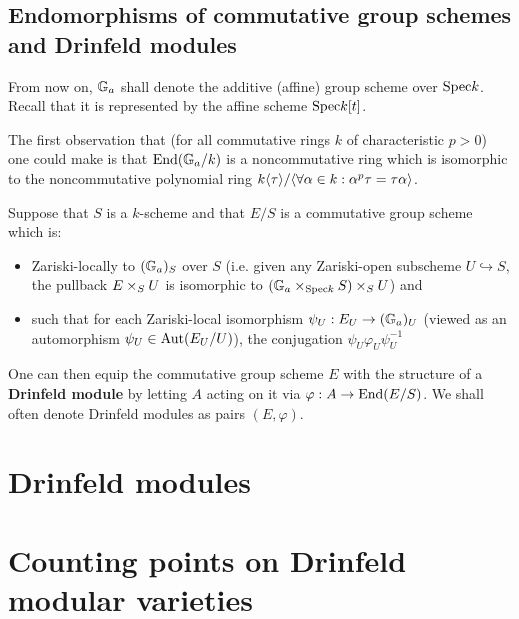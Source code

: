         \subsection{Endomorphisms of commutative group schemes and Drinfeld modules}
            \begin{convention}
                From now on, $\mathbb{G}_a$ shall denote the additive (affine) group scheme over $\mathrm{Spec} k$. Recall that it is represented by the affine scheme $\mathrm{Spec} k[t]$.
            \end{convention}
            \begin{remark}
                The first observation that (for all commutative rings $k$ of characteristic $p > 0$) one could make is that $\mathrm{End}(\mathbb{G}_a/k)$ is a noncommutative ring which is isomorphic to the noncommutative polynomial ring $k\langle\tau\rangle/\langle\forall \alpha \in k: \alpha^p \tau = \tau \alpha\rangle$. 
            \end{remark}
    
            \begin{definition} \label{def: drinfeld_modules}
                Suppose that $S$ is a $k$-scheme and that $E/S$ is a commutative group scheme which is:
                    \begin{itemize}
                        \item Zariski-locally to $(\mathbb{G}_a)_S$ over $S$ (i.e. given any Zariski-open subscheme $U \hookrightarrow S$, the pullback $E \x_S U$ is isomorphic to $(\G_a \x_{\Spec k} S) \x_S U$) and
                        \item such that for each Zariski-local isomorphism $\psi_U: E_U \to (\mathbb{G}_a)_U$ (viewed as an automorphism $\psi_U \in \mathrm{Aut}(E_U/U)$), the conjugation $\psi_U \varphi_U \psi_U^{-1}$
                    \end{itemize}
                One can then equip the commutative group scheme $E$ with the structure of a \textbf{Drinfeld module} by letting $A$ acting on it via $\varphi: A \to \mathrm{End}(E/S)$. We shall often denote Drinfeld modules as pairs $(E, \varphi)$.
            \end{definition}
    
    \section{Drinfeld modules}
    
    \section{Counting points on Drinfeld modular varieties}